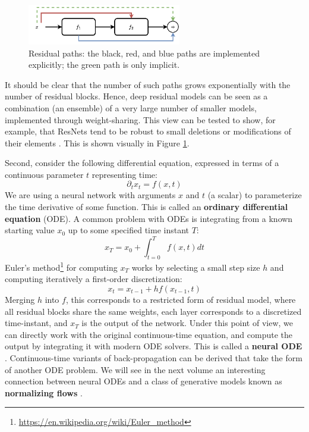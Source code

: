 \begin{figure}
    \centering
    \includegraphics[width=0.6\textwidth]{images/residual_paths}
    \caption{Residual paths: the black, red, and blue paths are implemented explicitly; the green path is only implicit.}
    \label{fig:residual_paths}
\end{figure}

It should be clear that the number of such paths grows exponentially with the number of residual blocks. Hence, deep residual models can be seen as a combination (an ensemble) of a very large number of smaller models, implemented through weight-sharing. This view can be tested to show, for example, that ResNets tend to be robust to small deletions or modifications of their elements \cite{veit2016residual}. This is shown visually in Figure \ref{fig:residual_paths}.

Second, consider the following differential equation, expressed in terms of a continuous parameter $t$ representing time:
%
$$
\partial_tx_t=f(x,t)
$$
%
We are using a neural network with arguments $x$ and $t$ (a scalar) to parameterize the time derivative of some function. This is called an \textbf{ordinary differential equation} (ODE). A common problem with ODEs is integrating from a known starting value $x_0$ up to some specified time instant $T$:
%
$$
x_T=x_0+\int_{t=0}^Tf(x,t)dt
$$
%
Euler's method\footnote{\url{https://en.wikipedia.org/wiki/Euler_method}} for computing $x_T$ works by selecting a small step size $h$ and computing iteratively a first-order discretization:
%
$$
x_t=x_{t-1}+hf(x_{t-1}, t)
$$
%
Merging $h$ into $f$, this corresponds to a restricted form of residual model, where all residual blocks share the same weights, each layer corresponds to a discretized time-instant, and $x_T$ is the output of the network. Under this point of view, we can directly work with the original continuous-time equation, and compute the output by integrating it with modern ODE solvers. This is called a \textbf{neural ODE} \cite{chen2018neural}. Continuous-time variants of back-propagation can be derived that take the form of another ODE problem. We will see in the next volume an interesting connection between neural ODEs and a class of generative models known as \textbf{normalizing flows} \cite{papamakarios2021normalizing}.

